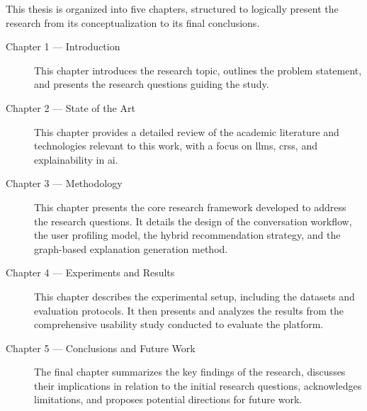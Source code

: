 This thesis is organized into five chapters, structured to logically present the research from its conceptualization to its final conclusions.

\begin{description}
    \item[Chapter 1 --- Introduction] This chapter introduces the research topic, outlines the problem statement, and presents the research questions guiding the study.
    \item[Chapter 2 --- State of the Art] This chapter provides a detailed review of the academic literature and technologies relevant to this work, with a focus on \acp{llm}, \acp{crs}, and explainability in \ac{ai}.
    \item[Chapter 3 --- Methodology] This chapter presents the core research framework developed to address the research questions. It details the design of the conversation workflow, the user profiling model, the hybrid recommendation strategy, and the graph-based explanation generation method.
    \item[Chapter 4 --- Experiments and Results] This chapter describes the experimental setup, including the datasets and evaluation protocols. It then presents and analyzes the results from the comprehensive usability study conducted to evaluate the platform.
    \item[Chapter 5 --- Conclusions and Future Work] The final chapter summarizes the key findings of the research, discusses their implications in relation to the initial research questions, acknowledges limitations, and proposes potential directions for future work.
\end{description}